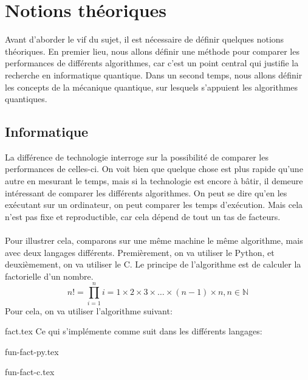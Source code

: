 \chapter{Notions théoriques}\label{ch:notions-theoriques}

Avant d'aborder le vif du sujet, il est nécessaire de définir quelques notions théoriques.
En premier lieu, nous allons définir une méthode pour comparer les performances de différents algorithmes,
car c'est un point central qui justifie la recherche en informatique quantique.
Dans un second temps, nous allons définir les concepts de la mécanique quantique, sur lesquels
s'appuient les algorithmes quantiques.

\section{Informatique}\label{sec:informatique}

La différence de technologie interroge sur la possibilité de comparer les performances de celles-ci.
On voit bien que quelque chose est plus rapide qu'une autre en mesurant le temps, mais si la technologie
est encore à bâtir, il demeure intéressant de comparer les différents algorithmes.
On peut se dire qu'en les exécutant sur un ordinateur, on peut comparer les temps d'exécution.
Mais cela n'est pas fixe et reproductible, car cela dépend de tout un tas de facteurs.\\ \\
Pour illustrer cela, comparons sur une même machine le même algorithme, mais avec deux langages différents.
Premièrement, on va utiliser le Python, et deuxièmement, on va utiliser le C\@.
Le principe de l'algorithme est de calculer la factorielle d'un nombre.
\[ n! = \prod_{i=1}^n i = 1 \times 2 \times 3 \times
\ldots \times (n-1) \times n, n \in \mathbb{N} \]
Pour cela, on va utiliser l'algorithme suivant:

{fact.tex}
Ce qui s'implémente comme suit dans les différents langages:

\begin{minipage}{0.45\textwidth}
{fun-fact-py.tex}
\end{minipage}
\hfill
\begin{minipage}{0.5\textwidth}
{fun-fact-c.tex}
\end{minipage}

